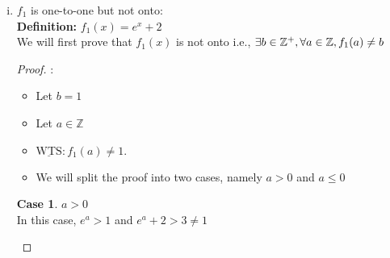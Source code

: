 \documentclass[12pt]{article}
\theoremstyle{definition}
\newtheorem{case}{Case}
\begin{document}
\begin{enumerate}
\begin{enumerate}[i)]
            \textbf{Definition:} $f_2(x) = |x|$
            \begin{proof}First, we will prove that $f_2$ is onto i.e., $\forall b \in \Z^+, \exists a \in \Z, f_2(a) = b$.
            
            Let $b \in \Z^{+}$. Let $a=b$. We want to prove that $f_2(a) = b$.
            \begin{align*}
                f_2(a) &= |a|\\
                &= a\\
                &= b
            \end{align*}
            \end{proof}
            Next, we will prove that $f_2(x)$ is \textbf{not} one-to-one i.e., $\exists p, q, \in \Z, f_2(p) = f_2(q) \land p \neq q$. Let $p=3$ and $q=-3$.
            \begin{proof}
            \begin{align*}
                f_{2}(p)=|3|=3=|-3|&=f_{2}(q)\\
                \text{so } f_2(p) &= f_2(q) \text{ is True} \\
                3 &\neq-3\\
                p &\neq q \text{ is also True}
            \end{align*}
            \end{proof}
            \item $f_1$ is one-to-one but not onto:\\
            \textbf{Definition:} $f_1(x) = e^{x} + 2$\\
            We will first prove that $f_1(x)$ is not onto i.e., $\exists b \in \mathbb Z^{+}, \forall a \in \mathbb Z, f_1(a) \neq b$
            \begin{proof}: 
            \begin{itemize}
                \item Let $b=1$
                \item Let $a \in \mathbb{Z}$
                \item $\underline{\text {WTS}}: f_{1}(a) \neq 1 .$
                \item We will split the proof into two cases, namely $a > 0$ and $a \leq 0$ 
            \end{itemize}
            \setcounter{case}{0}
            \begin{case} $a>0$\\
                    In this case, $e^{a}>1$ and $e^{a}+2>3 \neq 1$
            \end{case} 

\end{proof}
\end{enumerate}
\end{enumerate}
\end{document}
